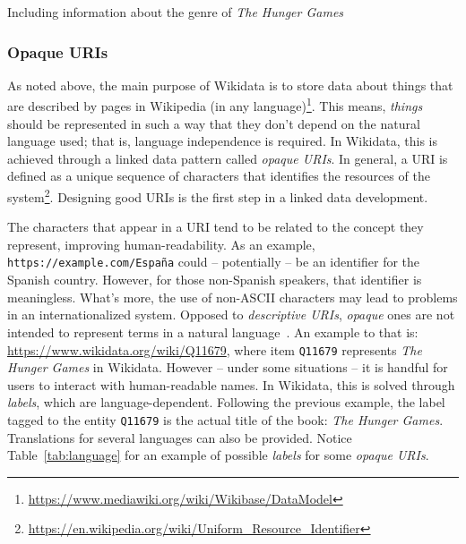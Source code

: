\begin{table}[ht]
    \centering
    
    \caption[Including information about the genre of \textit{The Hunger Games}]{Including information about the genre of \textit{The Hunger Games}\footnotemark}
    \label{tab:language}
\end{table}

\subsubsection{Opaque URIs}
\label{section:opaqueURIs}

As noted above, the main purpose of Wikidata is to store data about things that are described by pages in Wikipedia (in any language)\footnote{\url{https://www.mediawiki.org/wiki/Wikibase/DataModel}}. This means, \textit{things} should be represented in such a way that they don't depend on the natural language used; that is, language independence is required. In Wikidata, this is achieved through a linked data pattern called \textit{opaque URIs}. In general, a URI is defined as a unique sequence of characters that identifies the resources of the system\footnote{\url{https://en.wikipedia.org/wiki/Uniform_Resource_Identifier}}. Designing good URIs is the first step in a linked data development.

The characters that appear in a URI tend to be related to the concept they represent, improving human-readability. As an example, \texttt{https://example.com/España} could -- potentially -- be an identifier for the Spanish country. However, for those non-Spanish speakers, that identifier is meaningless. What's more, the use of non-ASCII characters may lead to problems in an internationalized system. Opposed to \textit{descriptive URIs}, \textit{opaque} ones are not intended to represent terms in a natural language~\cite{LabraGayo2015MultilingualLD}. An example to that is: \url{https://www.wikidata.org/wiki/Q11679}, where item \texttt{Q11679} represents \textit{The Hunger Games} in Wikidata. However -- under some situations -- it is handful for users to interact with human-readable names. In Wikidata, this is solved through \textit{labels}, which are language-dependent. Following the previous example, the label tagged to the entity \texttt{Q11679} is the actual title of the book: \textit{The Hunger Games}. Translations for several languages can also be provided. Notice Table~\ref{tab:language} for an example of possible \textit{labels} for some \textit{opaque URIs}.


